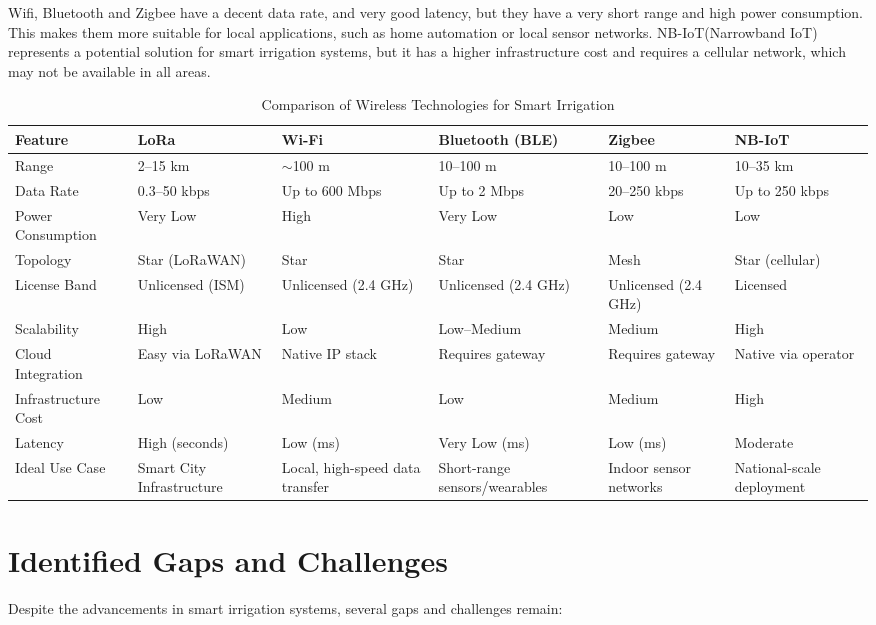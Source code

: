 Wifi, Bluetooth and Zigbee have a decent data rate, and very good latency, but they have a very short range 
and high power consumption. This makes them more suitable for local applications, 
such as home automation or local sensor networks. 
NB-IoT(Narrowband IoT) represents a potential solution for smart irrigation systems, but 
it has a higher infrastructure cost and requires a cellular network, which may not be available in all areas.

\begin{table}[ht]
\centering
\begin{tabular}{|p{3.2cm}|p{2.6cm}|p{2.6cm}|p{2.6cm}|p{2.6cm}|p{2.6cm}|}
\hline
\textbf{Feature} & \textbf{LoRa} & \textbf{Wi-Fi} & \textbf{Bluetooth (BLE)} & \textbf{Zigbee} & \textbf{NB-IoT} \\
\hline
Range & 2–15 km & $\sim$100 m & 10–100 m & 10–100 m & 10–35 km \\
\hline
Data Rate & 0.3–50 kbps & Up to 600 Mbps & Up to 2 Mbps & 20–250 kbps & Up to 250 kbps \\
\hline
Power Consumption & Very Low & High & Very Low & Low & Low \\
\hline
Topology & Star (LoRaWAN) & Star & Star & Mesh & Star (cellular) \\
\hline
License Band & Unlicensed (ISM) & Unlicensed (2.4 GHz) & Unlicensed (2.4 GHz) & Unlicensed (2.4 GHz) & Licensed \\
\hline
Scalability & High & Low & Low–Medium & Medium & High \\
\hline
Cloud Integration & Easy via LoRaWAN & Native IP stack & Requires gateway & Requires gateway & Native via operator \\
\hline
Infrastructure Cost & Low & Medium & Low & Medium & High \\
\hline
Latency & High (seconds) & Low (ms) & Very Low (ms) & Low (ms) & Moderate \\
\hline
Ideal Use Case & Smart City Infrastructure & Local, high-speed data transfer & Short-range sensors/wearables & Indoor sensor networks & National-scale deployment \\
\hline
\end{tabular}
\caption{Comparison of Wireless Technologies for Smart Irrigation}
\label{tab:wireless_comparison}
\end{table}


\section{Identified Gaps and Challenges}
Despite the advancements in smart irrigation systems, several gaps and challenges remain:

